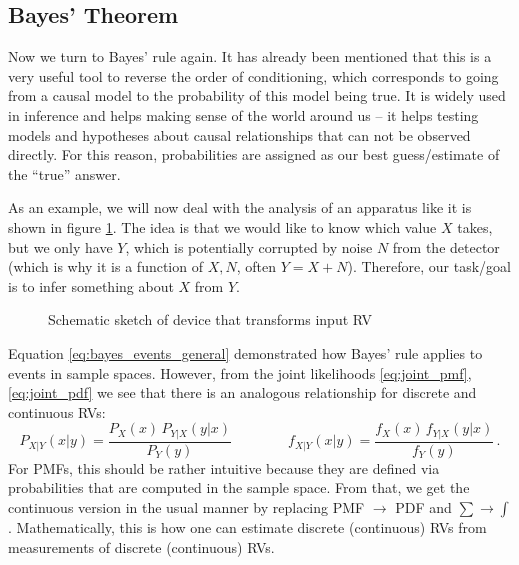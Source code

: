 	\subsection{Bayes' Theorem}
Now we turn to Bayes' rule again. It has already been mentioned that this is a very useful tool to reverse the order of conditioning, which corresponds to going from a causal model to the probability of this model being true. It is widely used in inference and helps making sense of the world around us -- it helps testing models and hypotheses about causal relationships that can not be observed directly. For this reason, probabilities are assigned as our best guess/estimate of the \enquote{true} answer.

As an example, we will now deal with the analysis of an apparatus like it is shown in figure \ref{fig:measure_device}. The idea is that we would like to know which value $X$ takes, but we only have $Y$, which is potentially corrupted by noise $N$ from the detector (which is why it is a function of $X, N$, often $Y = X + N$). Therefore, our task/goal is to infer something about $X$ from $Y$.\\



\begin{figure}[t]
\centering


\caption{Schematic sketch of device that transforms input RV}
\label{fig:measure_device}
\end{figure}



Equation \eqref{eq:bayes_events_general} demonstrated how Bayes' rule applies to events in sample spaces. However, from the joint likelihoods \eqref{eq:joint_pmf}, \eqref{eq:joint_pdf} we see that there is an analogous relationship for discrete and continuous RVs:
\begin{equation}
P_{X | Y}(x |  y) = \frac{P_X(x) \, P_{Y | X}(y | x)}{P_Y(y)} \qquad \qquad f_{X | Y}(x |  y) = \frac{f_X(x) \, f_{Y | X}(y | x)}{f_Y(y)} \, .
\end{equation}
For PMFs, this should be rather intuitive because they are defined via probabilities that are computed in the sample space. From that, we get the continuous version in the usual manner by replacing PMF $\rightarrow$ PDF and $\sum \rightarrow \int$. Mathematically, this is how one can estimate discrete (continuous) RVs from measurements of discrete (continuous) RVs.

